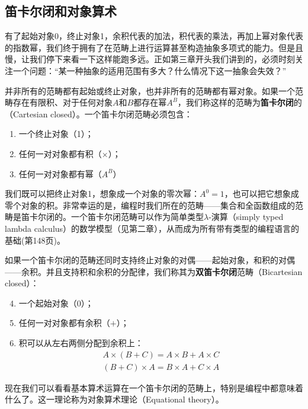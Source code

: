 \documentclass{article}
\begin{document}
\subsection{笛卡尔闭和对象算术}

有了起始对象0，终止对象1，余积代表的加法，积代表的乘法，再加上幂对象代表的指数幂，我们终于拥有了在范畴上进行运算甚至构造抽象多项式的能力。但是且慢，让我们停下来看一下这样能跑多远。正如第三章开头我们讲到的，必须时刻关注一个问题：“某一种抽象的适用范围有多大？什么情况下这一抽象会失效？”

并非所有的范畴都有起始或终止对象，也并非所有的范畴都有幂对象。如果一个范畴存在有限积、对于任何对象$A$和$B$都存在幂$A^B$，我们称这样的范畴为\textbf{笛卡尔闭}的（Cartesian closed）。一个笛卡尔闭范畴必须包含：

\begin{enumerate}
\item 一个终止对象（1）；
\item 任何一对对象都有积（$\times$）；
\item 任何一对对象都有幂（$A^B$）
\end{enumerate}

我们既可以把终止对象1，想象成一个对象的零次幂：$A^0 = 1$，也可以把它想象成零个对象的积。非常幸运的是，编程时我们所在的范畴——集合和全函数组成的范畴是笛卡尔闭的。一个笛卡尔闭范畴可以作为简单类型$\lambda$-演算（simply typed lambda calculus）的数学模型（见第二章），从而成为所有带有类型的编程语言的基础(\cite{Milewski2018}第148页)。

如果一个笛卡尔闭的范畴还同时支持终止对象的对偶——起始对象，和积的对偶——余积。并且支持积和余积的分配律，我们称其为\textbf{双笛卡尔闭}范畴（Bicartesian closed）：

\begin{enumerate}
  \setcounter{enumi}{3}
  \item 一个起始对象（0）；
  \item 任何一对对象都有余积（$+$）；
  \item 积可以从左右两侧分配到余积上：
  \[
  \begin{array}{l}
  A \times (B + C) = A \times B + A \times C \\
  (B + C) \times A = B \times A + C \times A
  \end{array}
  \]
\end{enumerate}

现在我们可以看看基本算术运算在一个笛卡尔闭的范畴上，特别是编程中都意味着什么了。这一理论称为对象算术理论（Equational theory）。
\end{document}
